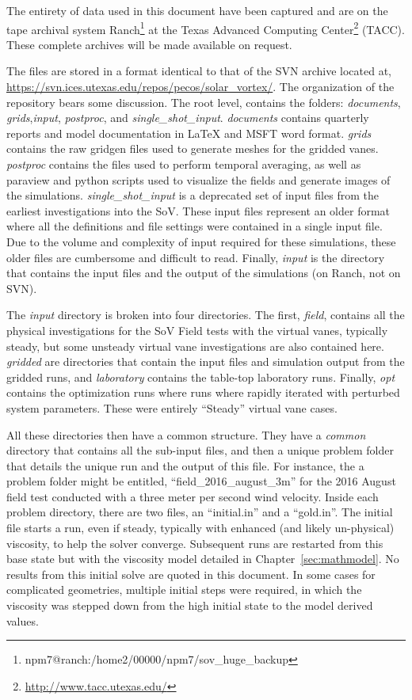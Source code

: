 \label{sec:archiving}


The entirety of data used in this document have been captured and
are on the tape archival system
Ranch\footnote{npm7@ranch:/home2/00000/npm7/sov\_huge\_backup} 
at the Texas Advanced Computing Center\footnote{%
    \url{http://www.tacc.utexas.edu/}
}
(TACC).  These complete archives will be made available on request. 

The files are stored in a format identical to that of the SVN archive
located at,
\url{https://svn.ices.utexas.edu/repos/pecos/solar_vortex/}. The
organization of the repository bears some discussion. The root level,
contains the folders: {\it documents}, {\it grids},{\it input}, {\it
postproc}, and {\it single\_shot\_input}. {\it documents} contains
quarterly reports and model documentation in LaTeX and MSFT word format.  
{\it grids} contains the raw gridgen files used to generate meshes for
the gridded vanes. {\it postproc} contains the files used to perform
temporal averaging, as well as paraview and python scripts used to
visualize the fields and generate images of the simulations. {\it
single\_shot\_input} is a deprecated set of input files from the
earliest investigations into the SoV. These input files represent an
older format where all the definitions and file settings were contained
in a single input file. Due to the volume and complexity of input
required for these simulations, these older files are cumbersome and
 difficult to read. Finally, {\it input} is the directory that
contains the input files and the output of the simulations (on
Ranch, not on SVN). 

The {\it input} directory is broken into four directories. The first,
{\it field}, contains all the physical investigations for the SoV Field
tests with the virtual vanes, typically steady, but some unsteady
virtual vane investigations are also contained here. {\it gridded} are
directories that contain the input files and simulation output from the
gridded runs, and {\it laboratory} contains the table-top laboratory
runs. Finally, {\it opt} contains the optimization runs where runs where
rapidly iterated with perturbed system parameters. These were entirely
``Steady'' virtual vane cases. 

All these directories then have a common structure. They have a {\it
common} directory that contains all the sub-input files, and then a
unique problem folder that details the unique run and the output
of this file. For instance, the a problem folder might be entitled,
``field\_2016\_august\_3m'' for the 2016 August field test conducted
with a three meter per second wind velocity. Inside each problem
directory, there are two files, an ``initial.in'' and a ``gold.in''. The
initial file starts a run, even if steady, typically with enhanced (and
likely un-physical) viscosity, to help the solver converge. Subsequent
runs are restarted from this base state but with the viscosity model
detailed in Chapter~\ref{sec:mathmodel}. No results from this initial
solve are quoted in this document. In some cases for complicated
geometries, multiple initial steps were required, in which the viscosity
was stepped down from the high initial state to the model derived
values. 

